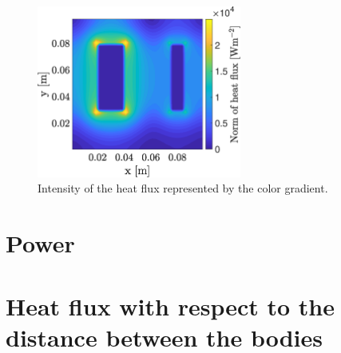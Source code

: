 \documentclass[a4paper,12pt,twoside]{article}
\begin{document}
\begin{figure}[h]
  \centering
  \includegraphics[width=0.6\textwidth]{graphs/c_heat_flux.eps}
  \caption{Intensity of the heat flux represented by the color gradient.}
  \label{fig:c-heat-flux}
\end{figure}

\section{Power}

\section{Heat flux with respect to the distance between the bodies}
\end{document}
